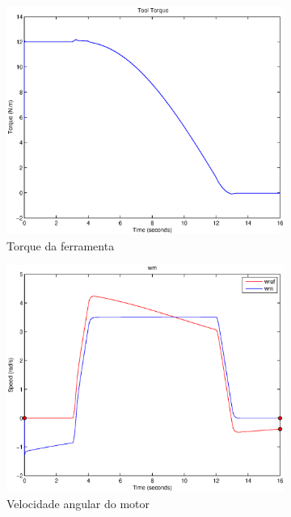 \documentclass{article}
\begin{document}
\begin{figure}[H]
\begin{subfigure}{0.32\textwidth}
		\includegraphics[width=\linewidth]{matlab/t4}
		\caption{Torque da ferramenta}
	\end{subfigure}
	\begin{subfigure}{0.32\textwidth}
		\includegraphics[width=\linewidth]{matlab/wm4}
		\caption{Velocidade angular do motor}
	\end{subfigure}
	\begin{subfigure}{0.32\textwidth}

\end{subfigure}
\end{figure}
\end{document}
